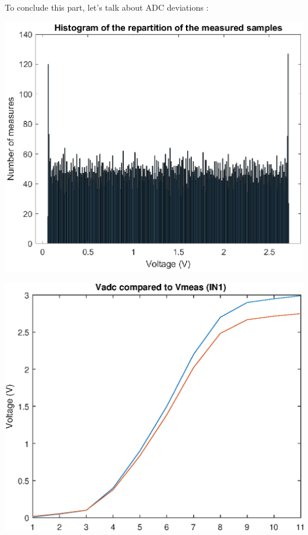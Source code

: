 To conclude this part, let's talk about ADC deviations :

\includegraphics[width=\SchematicWidth]{images/ADC/ADC-DNL.eps}

\includegraphics[width=\SchematicWidth]{images/ADC/gain-error.eps}

